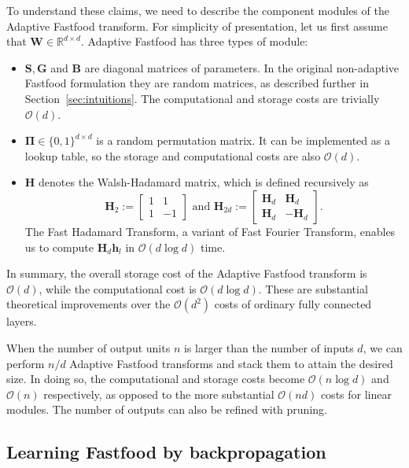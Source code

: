 \documentclass[10pt,twocolumn,letterpaper]{article}
\newcommand{\myvec}[1]{\mathbf{#1}}
\newcommand{\myvecsym}[1]{\boldsymbol{#1}}
\newcommand{\vPi}{\myvecsym{\Pi}}
\newcommand{\vh}{\myvec{h}}
\newcommand{\vB}{\myvec{B}}
\newcommand{\vG}{\myvec{G}}
\newcommand{\vH}{\myvec{H}}
\newcommand{\vS}{\myvec{S}}
\newcommand{\vW}{\myvec{W}}
\begin{document}
To understand these claims, we need to describe the component modules of the Adaptive Fastfood transform. For simplicity of presentation, let us first assume that $\vW \in \mathbb{R}^{d \times d}$. Adaptive Fastfood has three types of module:
\begin{itemize}
\item $\vS, \vG$ and  $\vB$ are diagonal matrices of parameters. In the original non-adaptive Fastfood formulation they are random matrices, as described further in Section~\ref{sec:intuitions}. The computational and storage costs are trivially $\mathcal{O}(d)$. 
\item $\vPi \in \{0,1\}^{d \times d}$ is a random permutation matrix. It can be implemented as a lookup table, so the storage and computational costs are also $\mathcal{O}(d)$.  
\item $\vH$ denotes the Walsh-Hadamard matrix, which is defined recursively as
$$\vH_2 := \begin{bmatrix} 1 & 1 \\ 1 & -1 \end{bmatrix} \mbox{  and }
\vH_{2d} := \begin{bmatrix} \vH_d & \vH_d \\ \vH_d & -\vH_d \end{bmatrix}.$$
The Fast Hadamard Transform, a variant of Fast Fourier Transform, enables us to
compute $\vH_d \vh_{l}$ in $\mathcal{O}(d \log d)$ time. 
\end{itemize}

In summary, the overall storage cost of the Adaptive Fastfood transform is 
$\mathcal{O}(d)$, while the computational cost is $\mathcal{O}(d \log d)$. These are substantial theoretical improvements over the $\mathcal{O}(d^2)$ costs of ordinary fully connected layers.

When the number of output units $n$ is larger than the number of inputs $d$, we can perform $n/d$ Adaptive Fastfood transforms and stack them to attain the desired size. In doing so, the computational and storage costs become $\mathcal{O}(n \log d)$ and $\mathcal{O}(n)$ respectively, as opposed to the more substantial $\mathcal{O}(nd)$ costs for linear modules. The number of outputs can also be refined with pruning.


\subsection{Learning Fastfood by backpropagation}
\label{sec:learning}
\end{document}
